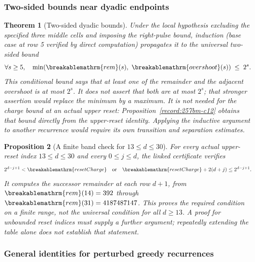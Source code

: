 \documentclass[11pt]{article}
\theoremstyle{plain}
\newtheorem{thm}{Theorem}[section]
\newtheorem{prop}[thm]{Proposition}
\theoremstyle{definition}
\theoremstyle{remark}
\renewcommand{\mathrm}[1]{\ifmmode\breakablemathrm{#1}\else\textrm{#1}\fi}%
\begin{document}
\subsubsection*{Two-sided bounds near dyadic endpoints}

\begin{thm}[Two-sided dyadic bounds]\label{record:257bm-i13}
Under the local hypothesis excluding the specified three middle cells and imposing the right-pulse
bound, induction (base case at row 5 verified by direct computation) propagates it to the universal
two-sided bound
\[
\forall s\ge5,\quad \min(\mathrm{rem}(s),\ \mathrm{overshoot}(s)) \;\le\; 2^s.
\]
This conditional bound says that at least one of the remainder and
the adjacent overshoot is at most $2^s$.  It does not assert that both
are at most $2^s$; that stronger assertion would replace the minimum
by a maximum.  It is not needed for the charge bound at an actual upper reset:
Proposition~\ref{record:257bm-c12} obtains that bound directly from the
upper-reset identity.  Applying the inductive argument to another
recurrence would require its own transition and separation estimates.
\end{thm}

\begin{prop}[A finite band check for $13\le d\le30$]\label{record:257bm-i14}
For every actual upper-reset index $13\le d\le30$ and every
$0\le j\le d$, the linked certificate verifies
\[
2^{d-j+1}<\mathrm{resetCharge}
\quad\text{or}\quad
\mathrm{resetCharge}+2(d+j)\le2^{d-j+1}.
\]
It computes the successor remainder at each row $d+1$, from
$\mathrm{rem}(14)=392$ through $\mathrm{rem}(31)=4187487147$.
This proves the required condition on a finite
range, not the universal condition for all $d\ge13$. A proof for
unbounded reset indices must supply a further argument; repeatedly
extending the table alone does not establish that statement.
\end{prop}

\subsubsection*{General identities for perturbed greedy recurrences}
\end{document}
